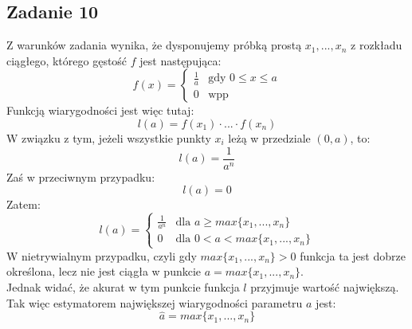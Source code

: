 \subsection{Zadanie 10}

Z warunków zadania wynika, że dysponujemy próbką prostą $x_{1},...,x_{n}$ z rozkładu ciągłego, 
którego gęstość $f$ jest następująca:
$$
f(x) =
\left\{ \begin{array}{ll}
\frac{1}{a} & \text{gdy } 0 \leq x \leq a \\
0 & \text{wpp}
\end{array} \right.
$$
Funkcją wiarygodności jest więc tutaj:
$$
l(a) = f(x_{1}) \cdot ... \cdot f(x_{n})
$$
W związku z tym, jeżeli wszystkie punkty $x_{i}$ leżą w przedziale $(0, a)$, to:
$$
l(a) = \frac{1}{a^{n}}
$$
Zaś w przeciwnym przypadku:
$$
l(a) = 0
$$
Zatem:
$$
l(a) = 
\left\{ \begin{array}{ll}
\frac{1}{a^n} & \text{dla } a \geq max\{x_{1},...,x_{n}\} \\
0 & \text{dla } 0 < a < max\{x_{1},...,x_{n}\}
\end{array} \right.
$$
W nietrywialnym przypadku, czyli gdy $max\{x_{1},...,x_{n}\} > 0$ funkcja ta jest dobrze określona,
lecz nie jest ciągła w punkcie $ a = max\{x_{1},...,x_{n}\}$. \\
Jednak widać, że akurat w tym punkcie funkcja $l$ przyjmuje wartość największą. \\
Tak więc estymatorem największej wiarygodności parametru $a$ jest:
$$
\hat{a} = max\{x_{1},...,x_{n}\}
$$
